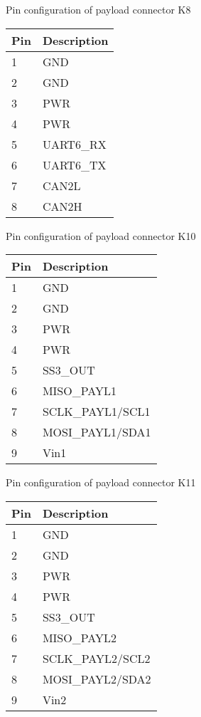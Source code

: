 \begin{appendix}
			\caption{Pin configuration of payload  connector K8}
			\begin{center}
				
				
				\begin{tabular}{p{3cm}p{3cm}}
					\toprule
					
					Pin & Description \\ \midrule
					1 & GND \\ 
					2 & GND \\ 
					3 & PWR \\ 
					4 & PWR \\ 
					5 & UART6\_RX \\ 
					6 & UART6\_TX \\ 
					7 & CAN2L \\ 
					8 & CAN2H \\ 
					\bottomrule
				\end{tabular}
				\label{k8}
			\end{center}
	
		\caption{Pin configuration of payload  connector K10}
		\begin{center}
			
			
			\begin{tabular}{p{3cm}p{3cm}}
				\toprule
				
				Pin & Description \\ \midrule
				1 & GND \\ 
				2 & GND \\ 
				3 & PWR \\ 
				4 & PWR \\ 
				5 & SS3\_OUT \\ 
				6 & MISO\_PAYL1 \\ 
				7 & SCLK\_PAYL1/SCL1 \\ 
				8 & MOSI\_PAYL1/SDA1 \\ 
				9 & Vin1 \\ 
				\bottomrule
			\end{tabular}
			\label{k10}
		\end{center}
	
		\caption{Pin configuration of payload  connector K11}
		\begin{center}
			
			
			\begin{tabular}{p{3cm}p{3cm}}
				\toprule
				
				Pin & Description \\ \midrule
				1 & GND \\ 
				2 & GND \\ 
				3 & PWR \\ 
				4 & PWR \\ 
				5 & SS3\_OUT \\ 
				6 & MISO\_PAYL2 \\ 
				7 & SCLK\_PAYL2/SCL2 \\ 
				8 & MOSI\_PAYL2/SDA2 \\ 
				9 & Vin2 \\ 
				\bottomrule
			\end{tabular}
			\label{k11}
		\end{center}


\end{appendix}
